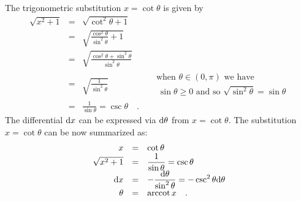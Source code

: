 \documentclass[12pt]{book}
\DeclareMathOperator{\arccot}{arccot}
\begin{document}
The trigonometric substitution $x=\cot \theta$ is given by
\begin{equation*}
\begin{array}{rcll|l}
\displaystyle \sqrt{ x^2+1}&=&\displaystyle \sqrt{\cot^2 \theta+1}\\
&=&\displaystyle \sqrt{\frac{\cos^2\theta}{ \sin^2 \theta} + 1}\\
&=&\displaystyle \sqrt{ \frac{ \cos^2 \theta+\sin^2\theta}{ \sin^2 \theta}} \\
&=& \displaystyle  \sqrt{\frac{1}{\sin^2\theta}} && \begin{array}{l}\displaystyle \text{when }\theta\in \left(0 , \pi\right) \text{ we have }\\ ~ \sin \theta \geq 0\text{ and so } \sqrt{\sin^2 \theta}=\sin\theta  \end{array}\\
&=&\displaystyle  \frac{1}{\sin \theta}= \csc \theta\quad .
\end{array}
\end{equation*}
The differential ${\normalfont \text{d}} x$ can be expressed via ${\normalfont \text{d}} \theta$ from $x=\cot \theta$. The substitution $x=\cot \theta$ can be now summarized as:
\[
\begin{array}{rcl}
x&=&\displaystyle \cot \theta\\
\sqrt{x^2+1}&=&\displaystyle \frac{1}{\sin \theta}=\csc \theta\\
\diff x&=&\displaystyle  -\frac{\diff \theta}{\sin^2\theta} = - \csc^2 \theta \diff \theta\\
\theta& =& \arccot x\quad .
\end{array}
\]
\end{document}
